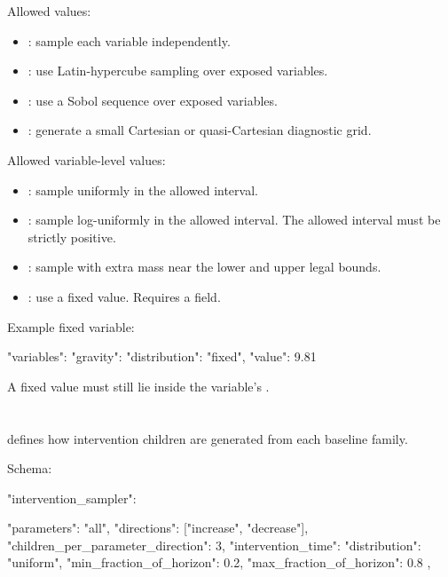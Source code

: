 \documentclass[11pt]{article}
\begin{document}
Allowed  values:

\begin{itemize}
    \item {}: sample each variable independently.
    \item {}: use Latin-hypercube sampling over exposed variables.
    \item {}: use a Sobol sequence over exposed variables.
    \item {}: generate a small Cartesian or quasi-Cartesian diagnostic grid.
\end{itemize}

Allowed variable-level  values:

\begin{itemize}
    \item {}: sample uniformly in the allowed interval.
    \item {}: sample log-uniformly in the allowed interval. The allowed interval must be strictly positive.
    \item {}: sample with extra mass near the lower and upper legal bounds.
    \item {}: use a fixed value. Requires a  field.
\end{itemize}

Example fixed variable:

\begin{DocCode}
"variables": {
  "gravity": {
    "distribution": "fixed",
    "value": 9.81
  }
}
\end{DocCode}

A fixed value must still lie inside the variable's .

\section*{}

 defines how intervention children are generated from each baseline family.

Schema:

\begin{DocCode}
"intervention_sampler": {
  "parameters": "all",
  "directions": ["increase", "decrease"],
  "children_per_parameter_direction": 3,
  "intervention_time": {
    "distribution": "uniform",
    "min_fraction_of_horizon": 0.2,
    "max_fraction_of_horizon": 0.8
  },

}
\end{DocCode}
\end{document}
